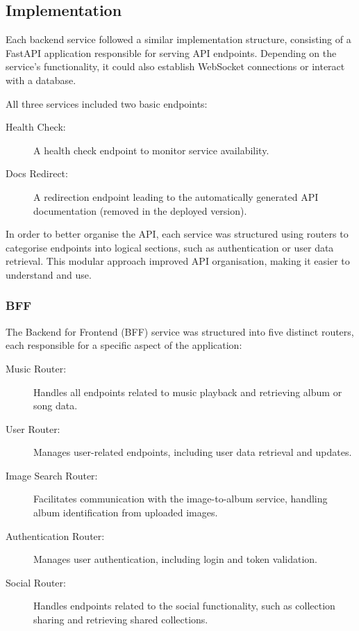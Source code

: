 \subsection{Implementation}
Each backend service followed a similar implementation structure, consisting of a FastAPI application responsible for serving API endpoints. Depending on the service's functionality, it could also establish WebSocket connections or interact with a database.

All three services included two basic endpoints:
\begin{description}
    \item[Health Check:] A health check endpoint to monitor service availability.
    \item[Docs Redirect:] A redirection endpoint leading to the automatically generated API documentation (removed in the deployed version).
\end{description}

In order to better organise the API, each service was structured using routers to categorise endpoints into logical sections, such as authentication or user data retrieval. This modular approach improved API organisation, making it easier to understand and use.

\subsubsection{BFF}
The Backend for Frontend (BFF) service was structured into five distinct routers, each responsible for a specific aspect of the application:

\begin{description}
    \item[Music Router:] Handles all endpoints related to music playback and retrieving album or song data.
    \item[User Router:] Manages user-related endpoints, including user data retrieval and updates.
    \item[Image Search Router:] Facilitates communication with the image-to-album service, handling album identification from uploaded images.
    \item[Authentication Router:] Manages user authentication, including login and token validation.
    \item[Social Router:] Handles endpoints related to the social functionality, such as collection sharing and retrieving shared collections.
\end{description}

